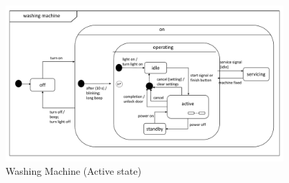 \documentclass[12pt]{article}
\begin{document}
\begin{spacing}{1.5}
\begin{figure}[h!]
	\centering
		\includegraphics[page=2,width=0.95\textwidth]{./figures/updatedSecondDraft.pdf}
		  \caption{Washing Machine (Active state) }
  \label{fig:wm-fig2}
\end{figure}

\end{spacing}
\end{document}
